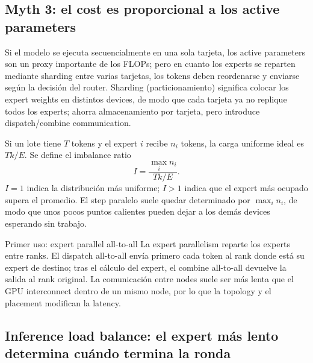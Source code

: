 \subsection{Myth 3: el cost es proporcional a los active parameters}

Si el modelo se ejecuta secuencialmente en una sola tarjeta, los active parameters son un proxy importante de los FLOPs; pero en cuanto los experts se reparten mediante sharding entre varias tarjetas, los tokens deben reordenarse y enviarse según la decisión del router. Sharding (particionamiento) significa colocar los expert weights en distintos devices, de modo que cada tarjeta ya no replique todos los experts; ahorra almacenamiento por tarjeta, pero introduce dispatch/combine communication.


Si un lote tiene $T$ tokens y el expert $i$ recibe $n_i$ tokens, la carga uniforme ideal es $T k/E$. Se define el imbalance ratio
\[
I=\frac{\max_i n_i}{Tk/E}.
\]
$I=1$ indica la distribución más uniforme; $I>1$ indica que el expert más ocupado supera el promedio. El step paralelo suele quedar determinado por $\max_i n_i$, de modo que unos pocos puntos calientes pueden dejar a los demás devices esperando sin trabajo.

\begin{knowledgebox}{Primer uso: expert parallel all-to-all}
La expert parallelism reparte los experts entre ranks. El dispatch all-to-all envía primero cada token al rank donde está su expert de destino; tras el cálculo del expert, el combine all-to-all devuelve la salida al rank original. La comunicación entre nodes suele ser más lenta que el GPU interconnect dentro de un mismo node, por lo que la topology y el placement modifican la latency.
\end{knowledgebox}


\subsection{Inference load balance: el expert más lento determina cuándo termina la ronda}

